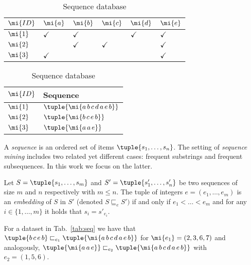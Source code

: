 \begin{table}[t]
    \begin{minipage}{.5\linewidth}
      \centering
\begin{tabular}{|l|l|l|l|l|l|}
\hline
$\mi{ID}$& $\mi{a}$ &$\mi{b}$&$\mi{c}$&$\mi{d}$&$\mi{e}$\\ \hline
$\mi{1}$ & $\checkmark$ &$\checkmark$ &&$\checkmark$&$\checkmark$\\ \hline
$\mi{2}$ &  &$\checkmark$ &$\checkmark$&&$\checkmark$\\ \hline
$\mi{3}$ &$\checkmark$ &&&&$\checkmark$ \\ \hline
\end{tabular}
      \caption{Transaction database}
\label{tab:it}
    \end{minipage}%
    \begin{minipage}{.5\linewidth}
      \centering
\begin{tabular}{|l|l|}
\hline
$\mi{ID}$& Sequence\\ \hline
$\mi{1}$ & $\tuple{\mi{a\,b\,c\,d\,a\,e\,b}}$ \\ \hline
$\mi{2}$ & $\tuple{\mi{b\,c\,e\,b}}$\\ \hline
$\mi{3}$ & $\tuple{\mi{a\,a\,e}}$ \\ \hline
\end{tabular}
      \caption{Sequence database}
\label{tab:seq}

    \end{minipage} 
\label{tab:ex}
\end{table}

 A \emph{sequence} is an ordered set of items $\tuple{s_1,\dotsc,s_n}$.
The setting of \emph{sequence mining} includes two related yet different cases: frequent substrings 
and frequent subsequences. In this work we focus on the latter. 


\begin{definition}\label{def:embseq}
Let $S=\tuple{s_1,\dotsc,s_m}$ and $S'=\tuple{s_1',\dotsc,s_n'}$ be  two  sequences  of  size $m$ and $n$ respectively  with $m \leq n$.  The  tuple  of  integers $e=(e_1,\dotsc,e_m)$ is an \emph{embedding} of $S$ in $S'$ (denoted $S\sqsubseteq_e S')$ if and only if $e_1< \dotsc < e_m$ and for any $i \in \{1,\ldots,m\}$ it holds that $s_i=s'_{e_i}$.
\end{definition}


\begin{example}\label{ex:seq}
For a dataset in Tab.~\ref{tab:seq} we have that $\tuple{b\,c\,e\,b} \sqsubset_{e_1} \tuple{\mi{a\,b\,c\,d\,a\,e\,b}}$ for $\mi{e_1}=(2,3,6,7)$ and analogously, $\tuple{\mi{a\,a\,e}}\sqsubset_{e_2} \tuple{\mi{a\,b\,c\,d\,a\,e\,b}}$ with $e_2=(1,5,6)$.
\end{example}

